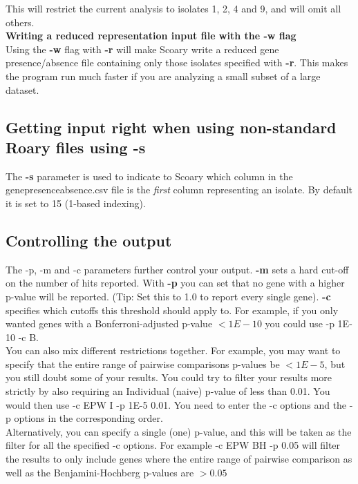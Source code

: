 \documentclass{article}
\begin{document}
      This will restrict the current analysis to isolates 1, 2, 4 and 9, and will omit all others.\\

      \textbf{Writing a reduced representation input file with the -w flag}\\

      Using the \textbf{-w} flag with \textbf{-r} will make Scoary write a reduced gene presence/absence file containing only those isolates specified with \textbf{-r}. This makes the program run much faster if you are analyzing a small subset of a large dataset.\\

    \subsection{Getting input right when using non-standard Roary files using -s}

      The \textbf{-s} parameter is used to indicate to Scoary which column in the \\ gene\textunderscore presence\textunderscore absence.csv file is the \textit{first} column representing an isolate. By default it is set to 15 (1-based indexing).

    \subsection{Controlling the output}
    
      The -p, -m and -c parameters further control your output. \textbf{-m} sets a hard cut-off on the number of hits reported. With \textbf{-p} you can set that no gene with a higher p-value will be reported. (Tip: Set this to 1.0 to report every single gene). \textbf{-c} specifies which cutoffs this threshold should apply to. For example, if you only wanted genes with a Bonferroni-adjusted p-value $< 1E-10$ you could use -p 1E-10 -c B. \\

      You can also mix different restrictions together. For example, you may want to specify that the entire range of pairwise comparisons p-values be $< 1E-5$, but you still doubt some of your results. You could try to filter your results more strictly by also requiring an Individual (naive) p-value of less than 0.01. You would then use -c EPW I -p 1E-5 0.01. You need to enter the -c options and the -p options in the corresponding order. \\

      Alternatively, you can specify a single (one) p-value, and this will be taken as the filter for all the specified -c options. For example -c EPW BH -p 0.05 will filter the results to only include genes where the entire range of pairwise comparison as well as the Benjamini-Hochberg p-values are $> 0.05$ \\
\end{document}
